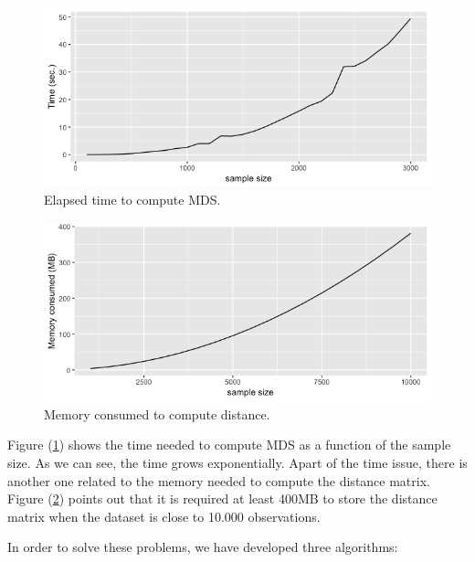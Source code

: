 \documentclass[11pt]{report}
\begin{document}
 
\begin{figure}[ht]
\centering
    \includegraphics[scale = 0.5]{./images/elapsed_time_mds.png}
    \caption{Elapsed time to compute MDS.}
    \label{elapsed_time_mds}
\end{figure}



\begin{figure}[ht]
\centering
\includegraphics[scale = 0.5]{./images/memory_distance.png}
\caption{Memory consumed to compute distance.}
\label{memory_distance}
\end{figure}


\indent Figure (\ref{elapsed_time_mds}) shows the time needed to compute MDS
as a function of the sample size. As we can see, the time grows 
exponentially. Apart of the time issue, there is another one related to the
memory needed to compute the distance matrix. Figure (\ref{memory_distance}) 
points out that it is required at least 400MB to store the distance 
matrix when the dataset is close to 10.000 observations.

\indent In order to solve these problems, we have developed three algorithms:
\end{document}
